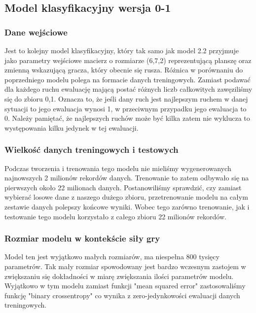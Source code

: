 \documentclass[12pt]{article}
\begin{document}
\subsection{Model klasyfikacyjny wersja 0-1}

\subsubsection{Dane wejściowe}

Jest to kolejny model klasyfikacyjny, który tak samo jak model 2.2 przyjmuje jako parametry wejściowe macierz o rozmiarze (6,7,2) reprezentującą planszę oraz zmienną wskazującą gracza, który obecnie się rusza. Różnica w porównaniu do poprzedniego modelu polega na formacie danych treningowych. Zamiast podawać dla każdego ruchu ewaluację mającą postać różnych liczb całkowitych zawęziliśmy się do zbioru {0,1}. Oznacza to, że jeśli dany ruch jest najlepszym ruchem w danej sytuacji to jego ewaluacja wynosi 1, w przeciwnym przypadku jego ewaluacja to 0. Należy pamiętać, że najlepszych ruchów może być kilka zatem nie wyklucza to występowania kilku jedynek w tej ewaluacji.

\subsubsection{Wielkość danych treningowych i testowych}

Podczas tworzenia i trenowania tego modelu nie mieliśmy wygenerowanych najnowszych 2 milionów rekordów danych. Trenowanie to zatem odbywało się na pierwszych około 22 milionach danych. Postanowiliśmy sprawdzić, czy zamiast wybierać losowe dane z naszego dużego zbioru, przetrenowanie modelu na całym zestawie danych polepszy końcowe wyniki. Wobec tego zarówno trenowanie, jak i testowanie tego modelu korzystało z całego zbioru 22 milionów rekordów.

\subsubsection{Rozmiar modelu w kontekście siły gry}

Model ten jest wyjątkowo małych rozmiarów, ma niespełna 800 tysięcy parametrów. Tak mały rozmiar spowodowany jest bardzo wczesnym zastojem w zwiększaniu się dokładności w miarę zwiększania ilości parametrów modelu. Wyjątkowo w tym modelu zamiast funkcji "mean squared error" zastosowaliśmy funkcję "binary crossentropy" co wynika z zero-jedynkowości ewaluacji danych treningowych.
\end{document}
